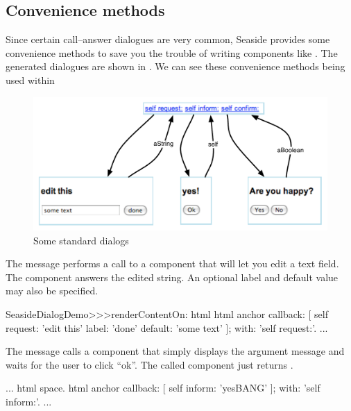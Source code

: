 \documentclass[a4paper,10pt,twoside]{book}
\begin{document}
\subsection{Convenience methods}

Since certain call--answer dialogues are very common, Seaside provides some convenience methods to save you the trouble of writing components like .
The generated dialogues are shown in .
We can see these convenience methods being used within 

\begin{figure}[b]
\begin{center}
\includegraphics[width=\textwidth]{dialogs}
\caption{Some standard dialogs}
\end{center}
\end{figure}

The message  performs a call to a component that will let you edit a text field.
The component answers the edited string.
An optional label and default value may also be specified.

\begin{code}{}
SeasideDialogDemo>>>renderContentOn: html
	html anchor
		callback: [ self request: 'edit this' label: 'done' default: 'some text' ];
		with: 'self request:'.
...
\end{code}

The message  calls a component that simply displays the argument message and waits for the user to click ``ok''.
The called component just returns .

\begin{code}{}
...
	html space.
	html anchor
		callback: [ self inform: 'yesBANG' ];
		with: 'self inform:'.
...
\end{code}
\end{document}

